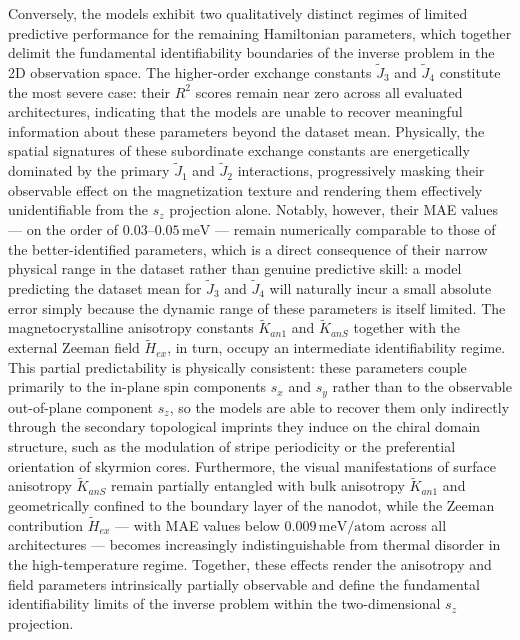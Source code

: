 \documentclass[a4paper,fleqn]{cas-sc}
\begin{document}
Conversely, the models exhibit two qualitatively distinct regimes of
limited predictive performance for the remaining Hamiltonian
parameters, which together delimit the fundamental identifiability
boundaries of the inverse problem in the 2D observation space. The
higher-order exchange constants $\tilde{J}_3$ and $\tilde{J}_4$
constitute the most severe case: their $R^2$ scores remain near zero
across all evaluated architectures, indicating that the models are
unable to recover meaningful information about these parameters
beyond the dataset mean. Physically, the spatial signatures of these
subordinate exchange constants are energetically dominated by the
primary $\tilde{J}_1$ and $\tilde{J}_2$ interactions, progressively
masking their observable effect on the magnetization texture and
rendering them effectively unidentifiable from the $s_z$ projection
alone. Notably, however, their MAE values --- on the order of
$0.03$--$0.05\,\mathrm{meV}$ --- remain numerically comparable to
those of the better-identified parameters, which is a direct
consequence of their narrow physical range in the dataset rather than
genuine predictive skill: a model predicting the dataset mean for
$\tilde{J}_3$ and $\tilde{J}_4$ will naturally incur a small absolute
error simply because the dynamic range of these parameters is itself
limited. The magnetocrystalline anisotropy constants $\tilde{K}_{an1}$
and $\tilde{K}_{anS}$ together with the external Zeeman field
$\tilde{H}_{ex}$, in turn, occupy an intermediate identifiability
regime. This partial predictability is physically consistent: these
parameters couple primarily to the in-plane spin components $s_x$
and $s_y$ rather than to the observable out-of-plane component
$s_z$, so the models are able to recover them only indirectly through
the secondary topological imprints they induce on the chiral domain
structure, such as the modulation of stripe periodicity or the
preferential orientation of skyrmion cores. Furthermore, the visual
manifestations of surface anisotropy $\tilde{K}_{anS}$ remain
partially entangled with bulk anisotropy $\tilde{K}_{an1}$ and
geometrically confined to the boundary layer of the nanodot, while
the Zeeman contribution $\tilde{H}_{ex}$ --- with MAE values below
$0.009\,\mathrm{meV/atom}$ across all architectures --- becomes
increasingly indistinguishable from thermal disorder in the
high-temperature regime. Together, these effects render the anisotropy
and field parameters intrinsically partially observable and define the
fundamental identifiability limits of the inverse problem within the
two-dimensional $s_z$ projection.
\end{document}
